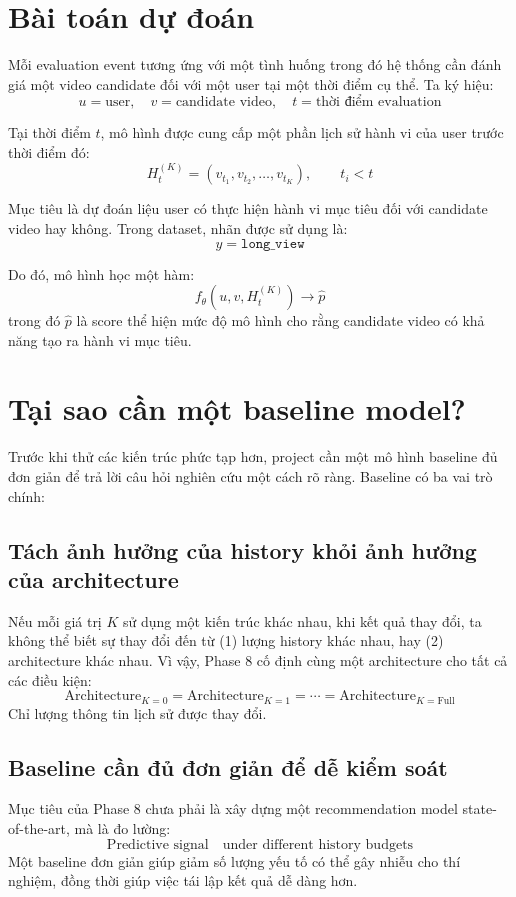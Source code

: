 \documentclass[12pt,a4paper]{article}
\begin{document}
\section{Bài toán dự đoán}

Mỗi evaluation event tương ứng với một tình huống trong đó hệ thống cần đánh giá một video candidate đối với một user tại một thời điểm cụ thể. Ta ký hiệu:
\[
u = \text{user}, \quad v = \text{candidate video}, \quad t = \text{thời điểm evaluation}
\]

Tại thời điểm $t$, mô hình được cung cấp một phần lịch sử hành vi của user trước thời điểm đó:
\[
H_t^{(K)} = (v_{t_1}, v_{t_2}, \ldots, v_{t_K}), \qquad t_i < t
\]

Mục tiêu là dự đoán liệu user có thực hiện hành vi mục tiêu đối với candidate video hay không. Trong dataset, nhãn được sử dụng là:
\[
y = \texttt{long\_view}
\]

Do đó, mô hình học một hàm:
\[
f_\theta(u, v, H_t^{(K)}) \rightarrow \hat{p}
\]
trong đó $\hat{p}$ là score thể hiện mức độ mô hình cho rằng candidate video có khả năng tạo ra hành vi mục tiêu.

\section{Tại sao cần một baseline model?}

Trước khi thử các kiến trúc phức tạp hơn, project cần một mô hình baseline đủ đơn giản để trả lời câu hỏi nghiên cứu một cách rõ ràng. Baseline có ba vai trò chính:

\subsection{Tách ảnh hưởng của history khỏi ảnh hưởng của architecture}
Nếu mỗi giá trị $K$ sử dụng một kiến trúc khác nhau, khi kết quả thay đổi, ta không thể biết sự thay đổi đến từ (1) lượng history khác nhau, hay (2) architecture khác nhau. Vì vậy, Phase 8 cố định cùng một architecture cho tất cả các điều kiện:
\[
\mathrm{Architecture}_{K=0} = \mathrm{Architecture}_{K=1} = \cdots = \mathrm{Architecture}_{K=\mathrm{Full}}
\]
Chỉ lượng thông tin lịch sử được thay đổi.

\subsection{Baseline cần đủ đơn giản để dễ kiểm soát}
Mục tiêu của Phase 8 chưa phải là xây dựng một recommendation model state-of-the-art, mà là đo lường:
\[
\text{Predictive signal} \quad \text{under different history budgets}
\]
Một baseline đơn giản giúp giảm số lượng yếu tố có thể gây nhiễu cho thí nghiệm, đồng thời giúp việc tái lập kết quả dễ dàng hơn.
\end{document}
